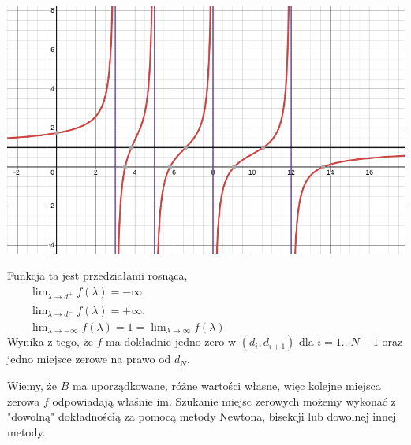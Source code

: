\documentclass[a4paper,12pt]{article}
\begin{document}
\begin{multicols}{2}
    \includegraphics[scale=0.3]{img/f_lambda.png}

    \columnbreak

    Funkcja ta jest przedziałami rosnąca,\\
    $\qquad\lim_{\lambda \to d_i^+} f(\lambda) = -\infty$,\\
    $\qquad\lim_{\lambda \to d_i^-} f(\lambda) = +\infty$,\\
    $\qquad\lim_{\lambda \to -\infty} f(\lambda) = 1 = \lim_{\lambda \to \infty} f(\lambda)$\\

    Wynika z tego, że $f$ ma dokładnie jedno zero w $(d_i, d_{i+1})$
    dla $i=1...N-1$ oraz jedno miejsce zerowe na prawo od $d_N$.
\end{multicols}

Wiemy, że $B$ ma uporządkowane, różne wartości własne, więc kolejne miejsca zerowa $f$
odpowiadają właśnie im. Szukanie miejsc zerowych możemy wykonać z "dowolną" dokładnością
za pomocą metody Newtona, bisekcji lub dowolnej innej metody.
\end{document}
